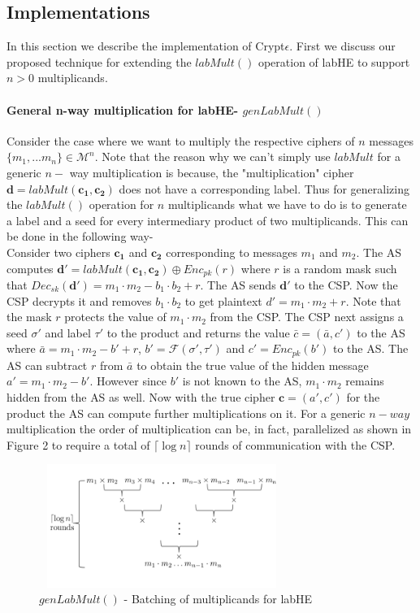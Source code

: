 \subsection{Implementations}\label{implementation}
In this section we describe the implementation of Crypt$\epsilon$. First we discuss our proposed technique for extending the $labMult()$ operation of \textsf{labHE} to support $n > 0$ multiplicands.  
 \paragraph*{\textbf{General n-way multiplication for \textsf{labHE}- $genLabMult()$}}
Consider the case where we want to multiply the respective ciphers of  $n$ messages $\{m_1,...m_n\} \in \mathcal{M}^n$. Note that the reason why we can't simply use $labMult$ for a generic $n-$ way multiplication is because, the "multiplication" cipher $\mathbf{d}=labMult(\mathbf{c_1},\mathbf{c_2})$ does not have  a corresponding label. Thus for generalizing the $labMult()$ operation for $n$ multiplicands what we have to do is to generate a label and a seed for every intermediary product of two multiplicands. This can be done in the following way-  \\
Consider two ciphers $\mathbf{c_1}$ and $\mathbf{c_2}$ corresponding to messages $m_1$ and $m_2$. The \textsf{AS} computes 
$\textbf{d}'=labMult(\mathbf{c_1,c_2}) \oplus Enc_{pk}(r)$ where $r$ is a random mask such that $Dec_{sk}(\textbf{d}')=m_1\cdot m_2-b_1\cdot b_2+r$. The \textsf{AS} sends $\textbf{d}'$ to the \textsf{CSP}. Now the \textsf{CSP} decrypts it and removes  $b_1\cdot b_2$ to get plaintext $d'=m_1\cdot m_2+r$. Note that the mask $r$ protects the value of $m_1\cdot m_2$ from the \textsf{CSP}. The \textsf{CSP} next assigns a seed $\sigma'$ and label $\tau'$ to the product and returns the value $\bar{c}=(\bar{a},c')$ to the \textsf{AS} where $\bar{a}=m_1\cdot m_2 -b' +r$, $b'=\mathcal{F}(\sigma',\tau')$ and $c'=Enc_{pk}(b')$ to the \textsf{AS}. The \textsf{AS} can subtract $r$ from $\bar{a}$ to obtain the  true value of the hidden message $a'=m_1\cdot m_2 - b'$. However since $b'$ is not known to the \textsf{AS}, $m_1\cdot m_2$ remains hidden from the \textsf{AS} as well. Now with the true cipher $\mathbf{c}=(a',c')$ for the product the \textsf{AS} can compute further multiplications on it. 
For a generic $n-way$ multiplication the order of multiplication can be, in fact, parallelized as  shown in Figure 2 to require a total of $\lceil \log n\rceil$ rounds of communication with the \textsf{CSP}. 
\begin{figure}\includegraphics[height=4cm,width=8cm]{kk.png} \caption{ $genLabMult()$ - Batching of multiplicands for \textsf{labHE}} \end{figure}\\
